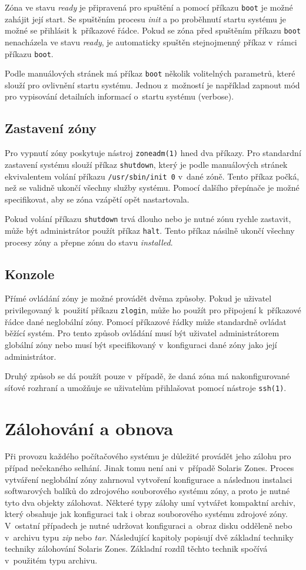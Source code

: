 Zóna ve stavu \textit{ready} je připravená pro spuštění a pomocí příkazu \verb|boot| je možné zahájit její start. Se spuštěním
procesu \textit{init} a po proběhnutí startu systému je možné se přihlásit k~příkazové řádce. Pokud se zóna před spuštěním příkazu
\verb|boot| nenacházela ve stavu \textit{ready}, je automaticky spuštěn stejnojmenný příkaz v~rámci příkazu \verb|boot|.

Podle manuálových stránek \cite{oracle:manpages:zoneadm} má příkaz \verb|boot| několik volitelných parametrů, které slouží
pro ovlivnění startu systému. Jednou z~možností je například zapnout mód pro vypisování detailních informací o~startu systému
(verbose).
\subsection{Zastavení zóny}
\label{chapter:zones:management:stop}
Pro vypnutí zóny poskytuje nástroj \verb|zoneadm(1)| hned dva příkazy. Pro standardní zastavení systému slouží příkaz \verb|shutdown|,
který je podle manuálových stránek \cite{oracle:manpages:zoneadm} ekvivalentem volání příkazu \verb|/usr/sbin/init 0| v~dané zóně.
Tento příkaz počká, než se validně ukončí všechny služby systému. Pomocí dalšího přepínače je možné specifikovat, aby
se zóna vzápětí opět nastartovala.

Pokud volání příkazu \verb|shutdown| trvá dlouho nebo je nutné zónu rychle zastavit, může být administrátor použít příkaz \verb|halt|.
Tento příkaz násilně ukončí všechny procesy zóny a přepne zónu do stavu \textit{installed}.
\subsection{Konzole}
\label{chapter:zones:management:console}
Přímé ovládání zóny je možné provádět dvěma způsoby. Pokud je uživatel privilegovaný k~použití příkazu \verb|zlogin|, může ho
použít pro připojení k~příkazové řádce dané neglobální zóny. Pomocí příkazové řádky může standardně ovládat běžící systém. Pro tento
způsob ovládání musí být uživatel administrátorem globální zóny nebo musí být specifikovaný v~konfiguraci dané zóny jako její
administrátor.

Druhý způsob se dá použít pouze v~případě, že daná zóna má nakonfigurované síťové rozhraní a umožňuje se uživatelům přihlašovat
pomocí nástroje \verb|ssh(1)|.
\section{Zálohování a obnova}
\label{chapter:zones:backup}
Při provozu každého počítačového systému je důležité provádět jeho zálohu pro případ nečekaného selhání. Jinak tomu není ani
v~případě Solaris Zones. Proces vytváření neglobální zóny zahrnoval vytvoření konfigurace a následnou instalaci softwarových
balíků do zdrojového souborového systému zóny, a proto je nutné tyto dva objekty zálohovat. Některé typy zálohy umí vytvářet
kompaktní archiv, který obsahuje jak konfiguraci tak i obraz souborového systému zdrojové zóny. V~ostatní případech je nutné
udržovat konfiguraci a~obraz disku odděleně nebo v~archivu typu \textit{zip} nebo \textit{tar}. Následující kapitoly popisují
dvě základní techniky techniky zálohování Solaris Zones. Základní rozdíl těchto technik spočívá v~použitém typu archivu.
